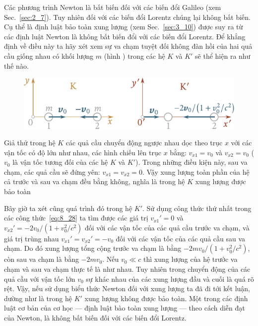 Các phương trình Newton là bất biến đối với các biến đổi Galileo (xem Sec.~\ref{sec:2_7}). Tuy nhiên đối với các biến đổi Lorentz chúng lại không bất biến. Cụ thể là định luật bảo toàn xung lượng (xem Sec.~\ref{sec:3_10}) được suy ra từ các định luật Newton là không bất biến đổi với các biến đổi Lorentz. Để khẳng định về điều này ta hãy xét xem sự va chạm tuyệt đối không đàn hồi của hai quả cầu giống nhau có khối lượng $m$ (hình ) trong các hệ $K$ và $K'$ sẽ thể hiện ra như thế nào.

\begin{figure}[!htb]
	\begin{center}
		\includegraphics[scale=0.95]{figures/ch_08/fig_8_4.pdf}
		\caption[]{}
		\label{fig:8_4}
	\end{center}
\end{figure}

Giả thử trong hệ $K$ các quả cầu chuyển động ngược nhau dọc theo trục $x$ với các vận tốc có độ lớn như nhau, các hình chiếu lên trục $x$ bằng: $v_{x1}=v_0$ và $v_{x2}=v_0$ ($v_0$ là vận tốc tương đối của các hệ $K$ và $K'$). Trong những điều kiện này, sau va chạm, các quả cầu sẽ đứng yên: $v_{x1}=v_{x2}=0$. Vậy xung lượng toàn phần của hệ cả trước và sau va chạm đều bằng không, nghĩa là trong hệ $K$ xung lượng được bảo toàn

Bây giờ ta xét cũng quá trình đó trong hệ $K'$. Sử dụng công thức thứ nhất trong các công thức~\eqref{eq:8_28} ta tìm được các giá trị $v_{x1}'=0$ và $v_{x2}'=-2v_0/(1+v_0^2/c^2)$ đối với các vận tốc của các quả cầu trước va chạm, và giá trị trùng nhau $v_{x1}'=v_{x2}'=-v_0$ đối với các vận tốc của các quả cầu sau va chạm. Do đó xung lượng tổng cộng trước va chạm là bằng $-2mv_0/(1+v_0^2/c^2)$, còn sau va chạm là bằng $-2mv_0$. Nếu $v_0\ll c$ thì xung lượng của hệ trước va chạm và sau va chạm thực tế là như nhau. Tuy nhiên trong chuyển động của các quả cầu với vận tốc lớn $v_0$ sự khác nhau của các xung lượng đầu và cuối là quá rõ rệt. Vậy, nếu sử dụng biểu thức Newton đối với xung lượng ta đã đi tới kết luận, dường như là trong hệ $K'$ xung lượng không được bảo toàn. Một trong các định luật cơ bản của cơ học --- định luật bào toàn xung lượng --- theo cách diễn đạt của Newton, là không bất biến đối với các biến đổi Lorentz.

